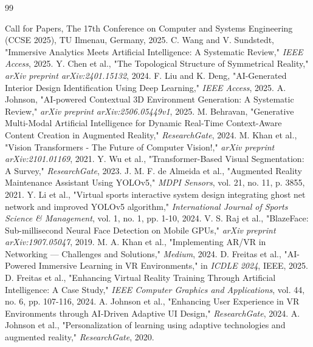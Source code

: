 \documentclass[conference]{IEEEtran}
\begin{document}
\begin{thebibliography}{99}

 Call for Papers, The 17th Conference on Computer and Systems Engineering (CCSE 2025), TU Ilmenau, Germany, 2025.
 C. Wang and V. Sundstedt, "Immersive Analytics Meets Artificial Intelligence: A Systematic Review," \textit{IEEE Access}, 2025.
 Y. Chen et al., "The Topological Structure of Symmetrical Reality," \textit{arXiv preprint arXiv:2401.15132}, 2024.
 F. Liu and K. Deng, "AI-Generated Interior Design Identification Using Deep Learning," \textit{IEEE Access}, 2025.
 A. Johnson, "AI-powered Contextual 3D Environment Generation: A Systematic Review," \textit{arXiv preprint arXiv:2506.05449v1}, 2025.
 M. Behravan, "Generative Multi-Modal Artificial Intelligence for Dynamic Real-Time Context-Aware Content Creation in Augmented Reality," \textit{ResearchGate}, 2024.
 M. Khan et al., "Vision Transformers - The Future of Computer Vision!," \textit{arXiv preprint arXiv:2101.01169}, 2021.
 Y. Wu et al., "Transformer-Based Visual Segmentation: A Survey," \textit{ResearchGate}, 2023.
 J. M. F. de Almeida et al., "Augmented Reality Maintenance Assistant Using YOLOv5," \textit{MDPI Sensors}, vol. 21, no. 11, p. 3855, 2021.
 Y. Li et al., "Virtual sports interactive system design integrating ghost net network and improved YOLOv5 algorithm," \textit{International Journal of Sports Science \& Management}, vol. 1, no. 1, pp. 1-10, 2024.
 V. S. Raj et al., "BlazeFace: Sub-millisecond Neural Face Detection on Mobile GPUs," \textit{arXiv preprint arXiv:1907.05047}, 2019.
 M. A. Khan et al., "Implementing AR/VR in Networking — Challenges and Solutions," \textit{Medium}, 2024.
 D. Freitas et al., "AI-Powered Immersive Learning in VR Environments," in \textit{ICDLE 2024}, IEEE, 2025.
 D. Freitas et al., "Enhancing Virtual Reality Training Through Artificial Intelligence: A Case Study," \textit{IEEE Computer Graphics and Applications}, vol. 44, no. 6, pp. 107-116, 2024.
 A. Johnson et al., "Enhancing User Experience in VR Environments through AI-Driven Adaptive UI Design," \textit{ResearchGate}, 2024.
 A. Johnson et al., "Personalization of learning using adaptive technologies and augmented reality," \textit{ResearchGate}, 2020.

\end{thebibliography}
\end{document}
